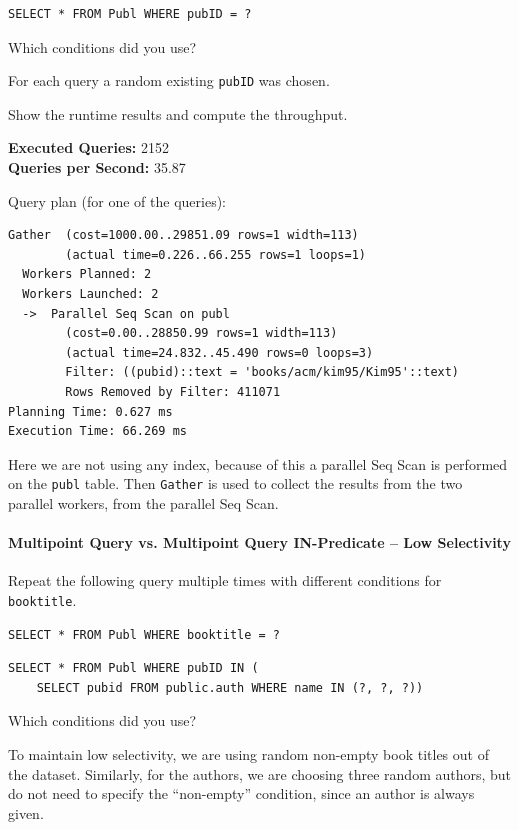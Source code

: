 \documentclass[11pt]{scrartcl}
\begin{document}
\begin{lstlisting}[style=dbtsql]
SELECT * FROM Publ WHERE pubID = ?
\end{lstlisting}

Which conditions did you use?

For each query a random existing \texttt{pubID} was chosen.

Show the runtime results and compute the throughput.

\textbf{Executed Queries: } 2152\\
\textbf{Queries per Second: } 35.87

Query plan (for one of the queries):

{\small
\parskip0pt\begin{verbatim}
Gather  (cost=1000.00..29851.09 rows=1 width=113)
        (actual time=0.226..66.255 rows=1 loops=1)
  Workers Planned: 2
  Workers Launched: 2
  ->  Parallel Seq Scan on publ
        (cost=0.00..28850.99 rows=1 width=113)
        (actual time=24.832..45.490 rows=0 loops=3)
        Filter: ((pubid)::text = 'books/acm/kim95/Kim95'::text)
        Rows Removed by Filter: 411071
Planning Time: 0.627 ms
Execution Time: 66.269 ms
\end{verbatim}}
Here we are not using any index, because of this a parallel Seq Scan is performed on the \texttt{publ} table.
Then \texttt{Gather} is used to collect the results from the two parallel workers, from the parallel Seq Scan.
\cite{ParallelQueryDocumentation2024}

\paragraph{Multipoint Query vs. Multipoint Query IN-Predicate -- Low Selectivity}

Repeat the following query multiple times with different conditions for \texttt{booktitle}.

\begin{lstlisting}[style=dbtsql]
SELECT * FROM Publ WHERE booktitle = ?
\end{lstlisting}

\begin{lstlisting}[style=dbtsql]
SELECT * FROM Publ WHERE pubID IN (
    SELECT pubid FROM public.auth WHERE name IN (?, ?, ?))
\end{lstlisting}

Which conditions did you use?

To maintain low selectivity, we are using random non-empty book titles out of the dataset.
Similarly, for the authors, we are choosing three random authors, but do not need to specify the \enquote{non-empty}
condition, since an author is always given.
\end{document}
